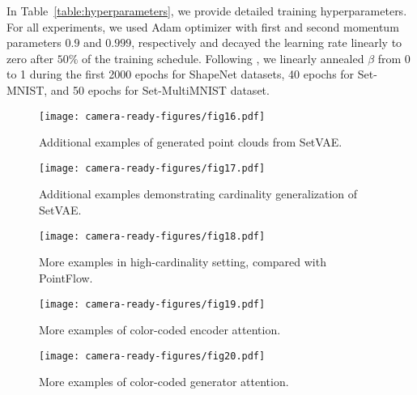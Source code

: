 \documentclass[final]{arxiv/cvpr}
\begin{document}
In Table~\ref{table:hyperparameters}, we provide detailed training hyperparameters.
For all experiments, we used Adam optimizer with first and second momentum parameters $0.9$ and $0.999$, respectively and decayed the learning rate linearly to zero after $50\%$ of the training schedule.
Following \cite{vahdat2020nvae}, we linearly annealed $\beta$ from 0 to 1 during the first 2000 epochs for ShapeNet datasets, 40 epochs for Set-MNIST, and 50 epochs for Set-MultiMNIST dataset.

\clearpage
\begin{figure*}[!ht]
    \centering
    \texttt{[image: camera-ready-figures/fig16.pdf]}
    \caption{Additional examples of generated point clouds from SetVAE.}
    \label{fig:more_samples}
\end{figure*}
\begin{figure*}[!ht]
    \centering
    \texttt{[image: camera-ready-figures/fig17.pdf]}
    \caption{Additional examples demonstrating cardinality generalization of SetVAE.}
    \label{fig:more_disentanglement}
\end{figure*}

\begin{figure*}[!ht]
    \centering
    \texttt{[image: camera-ready-figures/fig18.pdf]}
    \caption{More examples in high-cardinality setting, compared with PointFlow.}
    \label{fig:more_mega_cardinality}
\end{figure*}
\begin{figure*}[!ht]
    \centering
    \texttt{[image: camera-ready-figures/fig19.pdf]}
    \caption{More examples of color-coded encoder attention.}
    \label{fig:more_encoder_attention}
\end{figure*}
\begin{figure*}[!ht]
    \centering
    \texttt{[image: camera-ready-figures/fig20.pdf]}
    \caption{More examples of color-coded generator attention.}
    \label{fig:more_generator_attention}
\end{figure*}
\end{document}
